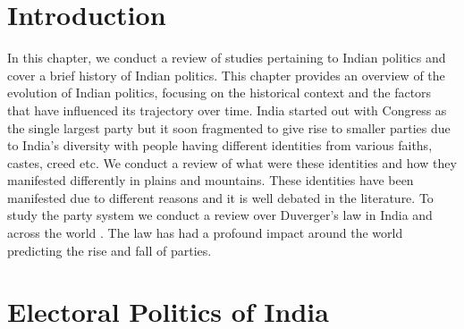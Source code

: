 \section{Introduction}
In this chapter, we conduct a review of studies pertaining to Indian politics and cover a brief history of Indian politics. This chapter provides an overview of the evolution of Indian politics, focusing on the historical context and the factors that have influenced its trajectory over time. India started out with Congress as the single largest party \citep{kothari1967india} but it soon fragmented to give rise to smaller parties due to India's diversity with people having different identities from various faiths, castes, creed etc. We conduct a review of what were these identities and how they manifested differently in plains and mountains. These identities have been manifested due to different reasons and it is well debated in the literature.  To study the party system we conduct a review over Duverger's law in India and across the world \citep{duverger1954political}. The law has had a profound impact around the world predicting the rise and fall of parties. 

\section{Electoral Politics of India}
